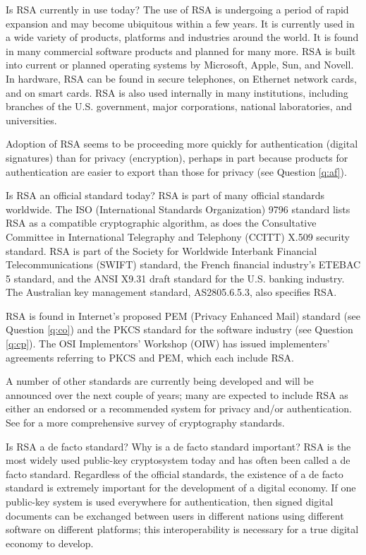 {Is RSA currently in use today?}
The use of RSA is undergoing a period of rapid expansion and may become 
ubiquitous within a few years. It is currently used in a wide variety of 
products, platforms and industries around the world. It is found in many 
commercial software products and planned for many more. RSA is built into 
current or planned operating systems by Microsoft, Apple, Sun, and Novell. 
In hardware, RSA can be found in secure telephones, on Ethernet network 
cards, and on smart cards. RSA is also used internally in many institutions, 
including branches of the U.S. government, major corporations, national 
laboratories, and universities.

Adoption of RSA seems to be proceeding more quickly for authentication 
(digital signatures) than for privacy (encryption), perhaps in part because 
products for authentication are easier to export than those for privacy (see 
Question \ref{q:af}). 

{Is RSA an official standard today?}
RSA is part of many official standards worldwide. The ISO (International
Standards Organization) 9796 standard lists RSA as a compatible 
cryptographic algorithm, as does the Consultative Committee in International 
Telegraphy and Telephony (CCITT) X.509 security standard. RSA is part of 
the Society for Worldwide Interbank Financial Telecommunications (SWIFT) 
standard, the French financial industry's ETEBAC 5 standard, and the ANSI 
X9.31 draft standard for the U.S. banking industry. The Australian key 
management standard, AS2805.6.5.3, also specifies RSA.

RSA is found in Internet's proposed PEM (Privacy Enhanced Mail) standard
(see Question \ref{q:co}) and the PKCS standard for the software industry 
(see Question \ref{q:cp}). The OSI Implementors' Workshop (OIW) has issued 
implementers' agreements referring to PKCS and PEM, which each include RSA. 

A number of other standards are currently being developed and will 
be announced over the next couple of years; many are expected to include 
RSA as either an endorsed or a recommended system for privacy and/or 
authentication. See \cite{kaliski-standards} for a more comprehensive 
survey of cryptography standards.

{Is RSA a de facto standard? Why is a de facto standard important?}
RSA is the most widely used public-key cryptosystem today and has often
been called a de facto standard. Regardless of the official standards, the 
existence of a de facto standard is extremely important for the development 
of a digital economy. If one public-key system is used everywhere for 
authentication, then signed digital documents can be exchanged between users 
in different nations using different software on different platforms; this
interoperability is necessary for a true digital economy to develop.

